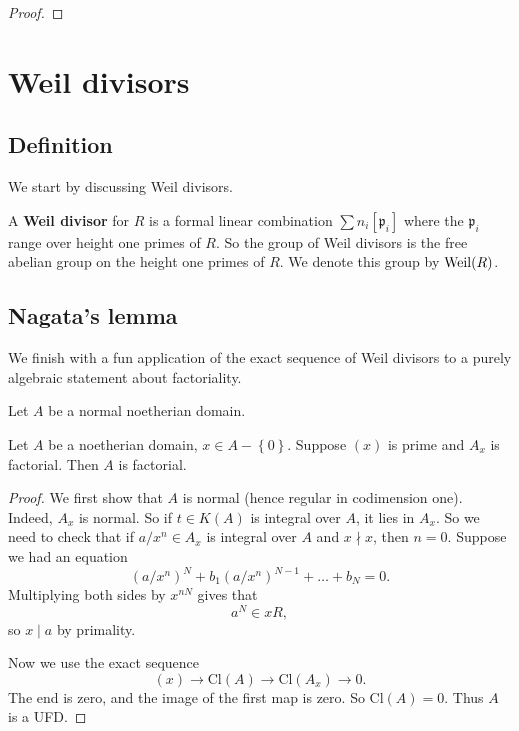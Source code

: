\begin{proof} 
\end{proof} 

\section{Weil divisors}

\subsection{Definition}
We start by discussing Weil divisors.
\begin{definition} 
A \textbf{Weil divisor} for $R$ is a formal linear combination $\sum n_{i}
[\mathfrak{p}_i]$ where the $\mathfrak{p}_i$ range over height one primes of
$R$. So the group of Weil divisors is the free abelian group on the height one
primes of $R$. We denote this group by $\operatorname{Weil}(R)$.
\end{definition} 




\subsection{Nagata's lemma} We finish with a fun application of the exact
sequence of Weil divisors to a purely algebraic statement about factoriality.

\begin{lemma} 
Let $A$ be a normal noetherian domain. 
\end{lemma} 

\begin{theorem} 
Let $A$ be a noetherian domain, $x \in A-\left\{0\right\}$. Suppose $(x)$ is
prime and $A_x$ is factorial. Then $A$ is factorial. 
\end{theorem} 
\begin{proof} 
We first show that $A$ is normal (hence regular in codimension one).
Indeed, $A_x$ is normal. So if $t \in K(A)$ is integral over $A$, it lies in
$A_x$. 
So we need to check that if $a/x^n \in A_x$ is integral over $A$ and $x \nmid
x$, then $n=0$.
Suppose we had an equation
\[ (a/x^n)^N + b_1 (a/x^n)^{N-1} + \dots + b_N = 0.  \]
Multiplying both sides by $x^{nN}$ gives that
\[ a^N \in xR,  \]
so $x \mid a$ by primality.

Now we use the exact sequence
\[ (x) \to \mathrm{Cl}(A) \to \mathrm{Cl}(A_x) \to 0.  \]
The end is zero, and the image of the first map is zero. So
$\mathrm{Cl}(A)=0$. Thus $A$ is a UFD.
\end{proof} 





